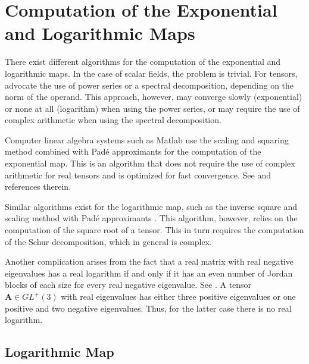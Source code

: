 \documentclass[12pt]{article}
\newcommand{\mbs}[1]{\boldsymbol{#1}}
\def\bA{{\mbs{A}}} \def\bB{{\mbs{B}}} \def\bC{{\mbs{C}}}
\begin{document}
\section{Computation of the Exponential and Logarithmic Maps}
\label{sec:explogmaps}

There exist different algorithms for the computation of the exponential and
logarithmic maps. In the case of scalar fields, the problem is trivial. For
tensors, \citet*{Ortiz.etal:2001} advocate the use of power series or a spectral
decomposition, depending on the norm of the operand. This approach, however, may
converge slowly (exponential) or none at all (logarithm) when using the power
series, or may require the use of complex arithmetic when using the spectral
decomposition.

Computer linear algebra systems such as Matlab use the scaling and
squaring method combined with Pad\'{e} approximants for the
computation of the exponential map. This is an algorithm that does not
require the use of complex arithmetic for real tensors and is
optimized for fast convergence. See \citep{Higham:2005} and
references therein.

Similar algorithms exist for the logarithmic map, such as the inverse
square and scaling method with Pad\'{e} approximants
\citep{Higham:2001}. This algorithm, however, relies on the
computation of the square root of a tensor. This in turn requires the
computation of the Schur decomposition, which in general is complex.

Another complication arises from the fact that a real matrix with real negative
eigenvalues has a real logarithm if and only if it has an even number of Jordan
blocks of each size for every real negative eigenvalue. See \citet[Chapters 1 \&
11]{Higham:2008}. A tensor $\bA \in GL^+(3)$ with real eigenvalues has either
three positive eigenvalues or one positive and two negative eigenvalues. Thus,
for the latter case there is no real logarithm.

\subsection{Logarithmic Map}
\end{document}

